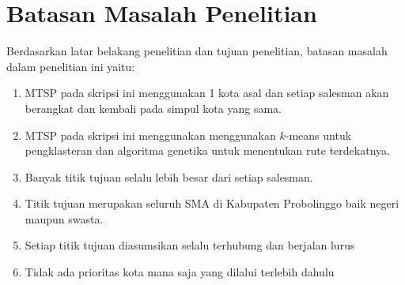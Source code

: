 \section{Batasan Masalah Penelitian}

Berdasarkan latar belakang penelitian dan tujuan penelitian, batasan masalah dalam penelitian ini yaitu:

\begin{enumerate}
	\item MTSP pada skripsi ini menggunakan 1 kota asal dan setiap salesman akan berangkat dan kembali pada simpul kota yang sama.
	\item MTSP pada skripsi ini menggunakan menggunakan $k$-means untuk pengklasteran dan algoritma genetika untuk menentukan rute terdekatnya.
	\item Banyak titik tujuan selalu lebih besar dari setiap salesman.
	\item Titik tujuan merupakan seluruh SMA di Kabupaten Probolinggo baik negeri maupun swasta.
	\item Setiap titik tujuan diasumsikan selalu terhubung dan berjalan lurus
	\item Tidak ada prioritas kota mana saja yang dilalui terlebih dahulu
\end{enumerate}